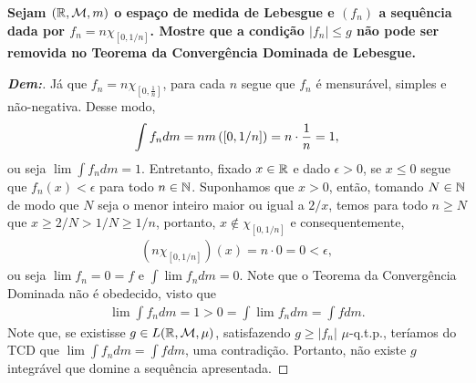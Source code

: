\textbf{Sejam $(\mathbb R, \mathcal M, m)$ o espaço de medida de Lebesgue e $(f_n)$
a sequência dada por $f_n =  n \chi_{[0, 1/n]}$. Mostre que a condição 
$|f_n| \le g$ não pode ser removida no Teorema da Convergência Dominada de Lebesgue.}
\begin{proof}[\textbf{Dem:}] Já que $f_n = n \chi_{[0, \frac{1}{n}]}$, para cada $n$ 
  segue que $f_n$ é mensurável, simples e não-negativa. Desse modo,
  \begin{align*}
    \int f_n dm = n m\left(\left[0, 1/n\right]\right) = n \cdot \frac{1}{n} =1,
  \end{align*}
  ou seja $\lim \int f_n dm = 1$. Entretanto, fixado $x \in \mathbb R$ e dado $\epsilon > 0$,
  se $x \le 0$ segue que $f_n(x) < \epsilon$ para todo $n \in \mathbb N$. Suponhamos que 
  $x > 0$, então, tomando $N \in \mathbb N$ de modo que $N$ seja o menor inteiro maior ou 
  igual a $2/x$, temos para todo $n \ge N$ que $x \ge 2/N > 1/N \ge 1/n$, portanto, 
  $x \not \in \chi_{[0, 1/n]}$ e consequentemente,
  \begin{align*}
      (n \chi_{[0, 1/n]})(x) = n\cdot 0 = 0 < \epsilon, 
  \end{align*}
  ou seja $\lim f_n = 0 = f$ e $\int \lim f_n dm = 0$. Note que o Teorema da Convergência 
  Dominada não é obedecido,
  visto que 
  \begin{align*}
    \lim \int f_n dm = 1 > 0 = \int \lim f_n dm = \int f dm.
  \end{align*}
  Note que, se existisse $g \in L(\mathbb R, \mathcal M, \mu)$, satisfazendo 
  $g \ge |f_n|$ $\mu$-q.t.p., teríamos do TCD que 
  $\lim \int f_n dm = \int f dm$, uma contradição. Portanto, não existe
  $g$ integrável que domine a sequência apresentada.
\end{proof}


